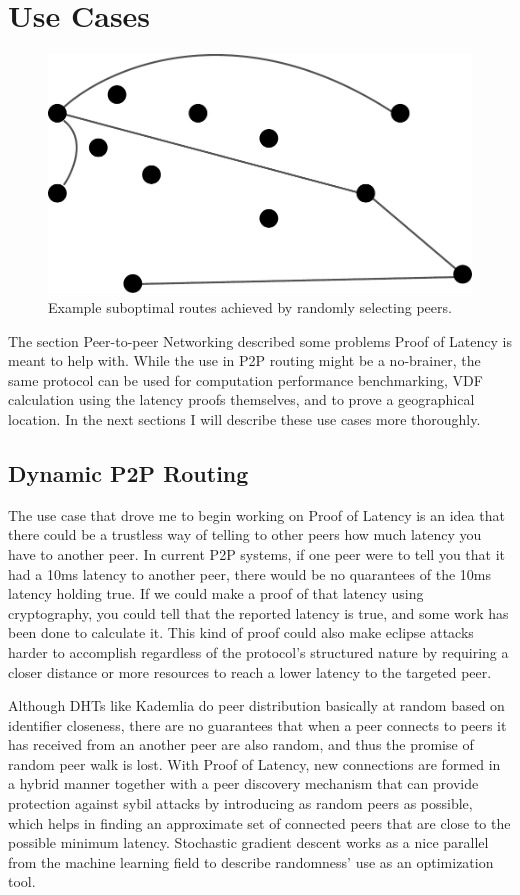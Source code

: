 \section{Use Cases}
\begin{figure}
	\includegraphics[width=\textwidth]{pictures/random_routing.pdf}
	\caption{Example suboptimal routes achieved by randomly selecting peers.}
	\label{Subobtimal Topology}
\end{figure}
The section Peer-to-peer Networking described some problems Proof of Latency is meant to help with. While the use in P2P routing might be a no-brainer, the same protocol can be used for computation performance benchmarking, VDF calculation using the latency proofs themselves, and to prove a geographical location. In the next sections I will describe these use cases more thoroughly.

\subsection{Dynamic P2P Routing}
The use case that drove me to begin working on Proof of Latency is an idea that there could be a trustless way of telling to other peers how much latency you have to another peer. In current P2P systems, if one peer were to tell you that it had a 10ms latency to another peer, there would be no quarantees of the 10ms latency holding true. If we could make a proof of that latency using cryptography, you could tell that the reported latency is true, and some work has been done to calculate it. This kind of proof could also make eclipse attacks harder to accomplish regardless of the protocol's structured nature by requiring a closer distance or more resources to reach a lower latency to the targeted peer.

Although DHTs like Kademlia do peer distribution basically at random based on identifier closeness, there are no guarantees that when a peer connects to peers it has received from an another peer are also random, and thus the promise of random peer walk is lost. With Proof of Latency, new connections are formed in a hybrid manner together with a peer discovery mechanism that can provide protection against sybil attacks by introducing as random peers as possible, which helps in finding an approximate set of connected peers that are close to the possible minimum latency. Stochastic gradient descent works as a nice parallel from the machine learning field to describe randomness' use as an optimization tool.

